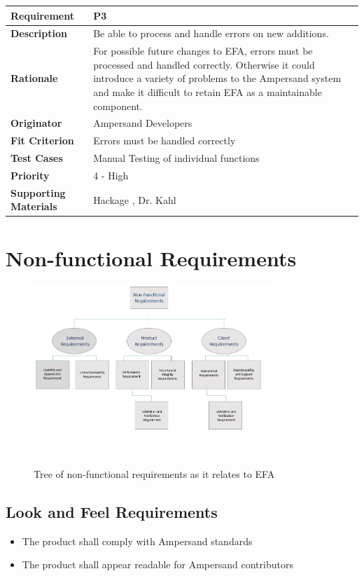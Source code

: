 \documentclass[12pt]{report}
\begin{document}
{\setlength{\tabcolsep}{6pt} %
    \begin{tabularx}{\textwidth}{>{\bfseries}C{3cm}X}
        Requirement & P3 \\ 
        \midrule
        \endhead
        Description  & Be able to process and handle errors on new additions.
        \\	Rationale & For possible future changes to EFA, errors must be 
        processed and handled correctly. Otherwise it could introduce a variety 
        of problems to the Ampersand system and make it difficult to retain EFA 
        as a maintainable component.
        \\	Originator & Ampersand Developers
        \\	Fit Criterion & Errors must be handled correctly
        \\ Test Cases & Manual Testing of individual functions
        \\	Priority & 4 - High
        \\	Supporting Materials & Hackage \cite{hackage}, Dr. Kahl
        \vspace{12pt}
    \end{tabularx}
}

\chapter{Non-functional Requirements}\label{ch:NonFunc}
\begin{figure}[!htb]
	\centering
	\includegraphics[width=0.8\textwidth]{../figures/NONFUNCTIONAL}
	\caption{Tree of non-functional requirements as it relates to EFA}~\label{fig:figure2}
\end{figure}

\section{Look and Feel Requirements}\label{sec:LookAndFeel}
\begin{itemize}
    \item The product shall comply with Ampersand standards
    \item The product shall appear readable for Ampersand contributors
\end{itemize}
\end{document}
